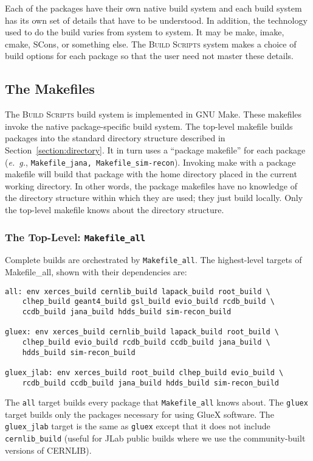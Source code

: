 \documentclass[12pt]{article}
\newcommand{\bs}{\textsc{Build Scripts}}
\begin{document}
Each of the packages have their own native build system and each build
system has its own set of details that have to be understood. In
addition, the technology used to do the build varies from system to
system. It may be make, imake, cmake, SCons, or something else. The
\bs{} system makes a choice of build options for each package so that
the user need not master these details.

\subsection{The Makefiles}

The \bs{} build system is implemented in GNU Make. These makefiles
invoke the native package-specific build system. The top-level
makefile builds packages into the standard directory structure
described in Section~\ref{section:directory}. It in turn uses a
``package
makefile'' for each package ({\it e.~g.}, {\tt Makefile\_jana,
  Makefile\_sim-recon}). Invoking make with a package makefile will
build that package with the home directory placed in the current
working directory. In other words, the package makefiles have no knowledge of
the directory structure within which they are used; they just build
locally. Only the top-level makefile knows about the directory structure.

\subsubsection{The Top-Level: {\tt Makefile\_all}}

Complete builds are orchestrated by {\tt Makefile\_all}. The highest-level
targets of Makefile\_all, shown with their dependencies are:

\begin{verbatim}
all: env xerces_build cernlib_build lapack_build root_build \
    clhep_build geant4_build gsl_build evio_build rcdb_build \
    ccdb_build jana_build hdds_build sim-recon_build

gluex: env xerces_build cernlib_build lapack_build root_build \
    clhep_build evio_build rcdb_build ccdb_build jana_build \
    hdds_build sim-recon_build

gluex_jlab: env xerces_build root_build clhep_build evio_build \
    rcdb_build ccdb_build jana_build hdds_build sim-recon_build
\end{verbatim}

The {\tt all} target builds every package that {\tt Makefile\_all} knows
about. The {\tt gluex} target builds only the packages necessary for
using GlueX software. The {\tt gluex\_jlab} target is the same as {\tt gluex}
except that it does not include {\tt cernlib\_build} (useful for JLab public
builds where we use the community-built versions of CERNLIB).
\end{document}

